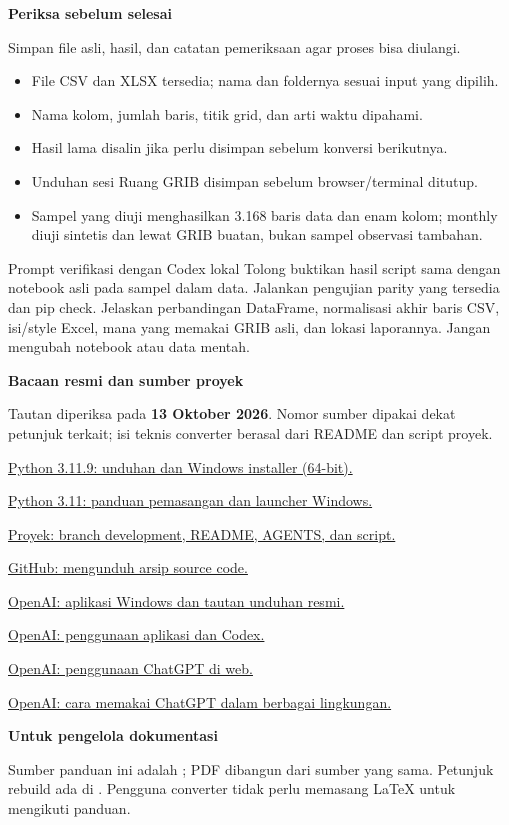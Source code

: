 \documentclass[11pt,a4paper]{article}
\newcommand{\pagetitle}[3]{\clearpage{\color{teal}\small\bfseries LANGKAH #1}\par{\color{slate}\LARGE\bfseries #2}\par\vspace{2mm}#3\par\vspace{3mm}}
\begin{document}
\pagetitle{15}{Periksa sebelum selesai}{Simpan file asli, hasil, dan catatan pemeriksaan agar proses bisa diulangi.}
\label{pg:references}
\begin{itemize}
\item File CSV dan XLSX tersedia; nama dan foldernya sesuai input yang dipilih.
\item Nama kolom, jumlah baris, titik grid, dan arti waktu dipahami.
\item Hasil lama disalin jika perlu disimpan sebelum konversi berikutnya.
\item Unduhan sesi Ruang GRIB disimpan sebelum browser/terminal ditutup.
\item Sampel yang diuji menghasilkan 3.168 baris data dan enam kolom;
      monthly diuji sintetis dan lewat GRIB buatan, bukan sampel observasi tambahan.
\end{itemize}
\begin{panel}{Prompt verifikasi dengan Codex lokal}
Tolong buktikan hasil script sama dengan notebook asli pada sampel dalam data.
Jalankan pengujian parity yang tersedia dan pip check. Jelaskan perbandingan
DataFrame, normalisasi akhir baris CSV, isi/style Excel, mana yang memakai
GRIB asli, dan lokasi laporannya. Jangan mengubah notebook atau data mentah.
\end{panel}
\textbf{Bacaan resmi dan sumber proyek}\par
\small
Tautan diperiksa pada \textbf{13 Oktober 2026}. Nomor sumber dipakai dekat
petunjuk terkait; isi teknis converter berasal dari README dan script proyek.
\begin{enumerate}[label={[\arabic*]},leftmargin=7mm,itemsep=2pt]
\item \href{https://www.python.org/downloads/release/python-3119/}{Python 3.11.9: unduhan dan Windows installer (64-bit).}
\item \href{https://docs.python.org/3.11/using/windows.html}{Python 3.11: panduan pemasangan dan launcher Windows.}
\item \href{https://github.com/ropok/grib-data-processing/tree/development}{Proyek: branch development, README, AGENTS, dan script.}
\item \href{https://docs.github.com/en/repositories/working-with-files/using-files/downloading-source-code-archives}{GitHub: mengunduh arsip source code.}
\item \href{https://learn.chatgpt.com/docs/windows/windows-app}{OpenAI: aplikasi Windows dan tautan unduhan resmi.}
\item \href{https://learn.chatgpt.com/docs/app}{OpenAI: penggunaan aplikasi dan Codex.}
\item \href{https://learn.chatgpt.com/docs/web}{OpenAI: penggunaan ChatGPT di web.}
\item \href{https://learn.chatgpt.com/docs/use-chatgpt}{OpenAI: cara memakai ChatGPT dalam berbagai lingkungan.}
\end{enumerate}
\normalsize
\textbf{Untuk pengelola dokumentasi}\par
Sumber panduan ini adalah ; PDF dibangun dari
sumber yang sama. Petunjuk rebuild ada di . Pengguna
converter tidak perlu memasang LaTeX untuk mengikuti panduan.
\label{pg:last}
\end{document}
